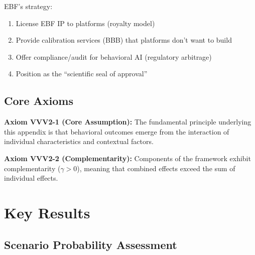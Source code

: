 EBF's strategy:
\begin{enumerate}
\item License EBF IP to platforms (royalty model)
\item Provide calibration services (BBB) that platforms don't want to build
\item Offer compliance/audit for behavioral AI (regulatory arbitrage)
\item Position as the ``scientific seal of approval''
\end{enumerate}



\subsection{Core Axioms}
\label{sec:vvv2-axioms}

\begin{tcolorbox}[colback=yellow!5!white,colframe=yellow!75!black,title=Axiom VVV2-1: Fundamental Principle]
\textbf{Axiom VVV2-1 (Core Assumption):}
The fundamental principle underlying this appendix is that behavioral outcomes
emerge from the interaction of individual characteristics and contextual factors.
\end{tcolorbox}

\begin{tcolorbox}[colback=yellow!5!white,colframe=yellow!75!black,title=Axiom VVV2-2: Complementarity]
\textbf{Axiom VVV2-2 (Complementarity):}
Components of the framework exhibit complementarity ($\gamma > 0$), meaning
that combined effects exceed the sum of individual effects.
\end{tcolorbox}


\section{Key Results}
\label{sec:vvv1-results}

\subsection{Scenario Probability Assessment}

